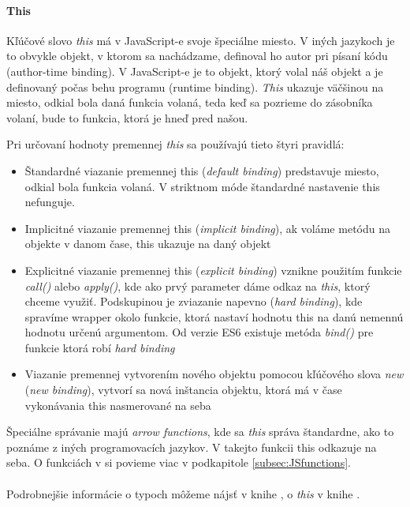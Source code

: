 \paragraph{This}
Kľúčové slovo \emph{this} má v JavaScript-e svoje špeciálne miesto. V iných jazykoch je to obvykle objekt, v ktorom sa nachádzame, definoval ho autor pri písaní kódu (author-time binding). V JavaScript-e je to objekt, ktorý volal náš objekt a je definovaný počas behu programu (runtime binding). \emph{This} ukazuje väčšinou na miesto, odkial bola daná funkcia volaná, teda keď sa pozrieme do zásobníka volaní, bude to funkcia, ktorá je hneď pred našou.

Pri určovaní hodnoty premennej \emph{this} sa používajú tieto štyri pravidlá:
\begin{itemize}
  \item Štandardné viazanie premennej this (\emph{default binding}) predstavuje miesto, odkial bola funkcia volaná. V striktnom móde štandardné nastavenie this nefunguje.
  \item Implicitné viazanie premennej this (\emph{implicit binding}), ak voláme metódu na objekte v danom čase, this ukazuje na daný objekt
  \item Explicitné viazanie premennej this (\emph{explicit binding}) vznikne použitím funkcie \emph{call()} alebo \emph{apply()}, kde ako prvý parameter dáme odkaz na \emph{this}, ktorý chceme využiť. Podskupinou je zviazanie napevno (\emph{hard binding}), kde spravíme wrapper okolo funkcie, ktorá nastaví hodnotu this na danú nemennú hodnotu určenú argumentom. Od verzie ES6 existuje metóda \emph{bind()} pre funkcie ktorá robí \emph{hard binding}
  \item Viazanie premennej vytvorením nového objektu pomocou kľúčového slova \emph{new} (\emph{new binding}), vytvorí sa nová inštancia objektu, ktorá má v čase vykonávania this nasmerované na seba
\end{itemize}

Špeciálne správanie majú \emph{arrow functions}, kde sa \emph{this} správa štandardne, ako to poznáme z iných programovacích jazykov. V takejto funkcii this odkazuje na seba.
O funkciách v \JS{} si povieme viac v podkapitole \ref{subsec:JSfunctions}.

\paragraph{}
Podrobnejšie informácie o typoch môžeme nájsť v knihe \cite[Types \& Grammar]{youDontKnowJS4}, o \emph{this} v knihe \cite[this \& Object Prototypes]{youDontKnowJS3}.

